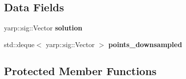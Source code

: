 \subsection*{Data Fields}
\begin{DoxyCompactItemize}
\item 
yarp\-::sig\-::\-Vector {\bfseries solution}\label{classSuperQuadric__NLP_abf380018deaca365a8b7cd837f36f1fa}

\item 
std\-::deque$<$ yarp\-::sig\-::\-Vector $>$ {\bfseries points\-\_\-downsampled}\label{classSuperQuadric__NLP_a9577e3ef86a127dec53a64953926c288}

\end{DoxyCompactItemize}
\subsection*{Protected Member Functions}
